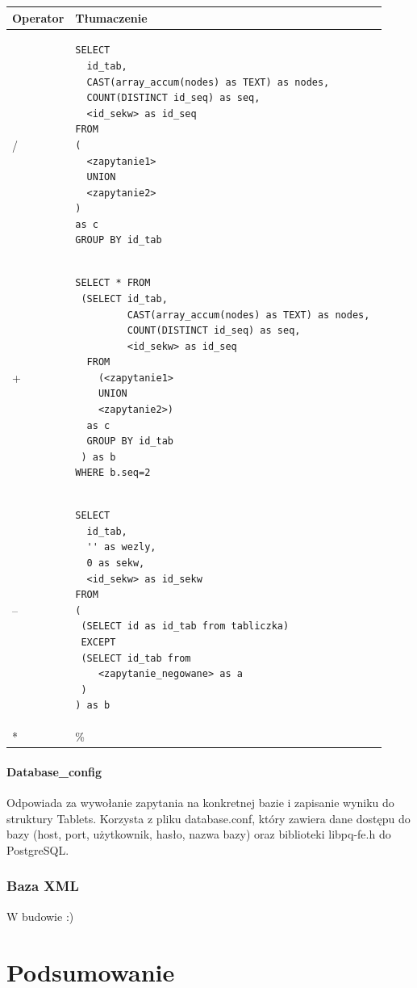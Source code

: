 \documentclass{pracamgr}
\begin{document}
\begin{longtable}{|p{1in}|p{4.5in}|}
\hline
{\bf Operator} & {\bf Tłumaczenie}\\
\hline
\endhead
/ & 
\begin{verbatim}
SELECT 
  id_tab, 
  CAST(array_accum(nodes) as TEXT) as nodes, 
  COUNT(DISTINCT id_seq) as seq,
  <id_sekw> as id_seq
FROM 
(
  <zapytanie1>
  UNION
  <zapytanie2>
)
as c
GROUP BY id_tab
\end{verbatim}
\\ 
\hline
+ &
\begin{verbatim}
SELECT * FROM
 (SELECT id_tab, 
         CAST(array_accum(nodes) as TEXT) as nodes, 
         COUNT(DISTINCT id_seq) as seq, 
         <id_sekw> as id_seq
  FROM
    (<zapytanie1>
    UNION
    <zapytanie2>)
  as c 
  GROUP BY id_tab
 ) as b
WHERE b.seq=2 
\end{verbatim}
\\ 
\hline
-- & 
\begin{verbatim}
SELECT 
  id_tab, 
  '' as wezly, 
  0 as sekw,
  <id_sekw> as id_sekw
FROM
(
 (SELECT id as id_tab from tabliczka)
 EXCEPT
 (SELECT id_tab from
    <zapytanie_negowane> as a
 )   
) as b
\end{verbatim}
\\ 
\hline
* & \%  \\ 
\hline
\end{longtable}


\subsubsection{Database\_config}

Odpowiada za wywołanie zapytania na konkretnej bazie i zapisanie wyniku do struktury Tablets.
 Korzysta z pliku database.conf, który zawiera dane dostępu do bazy (host, port, użytkownik, hasło, nazwa bazy)
oraz biblioteki libpq-fe.h do PostgreSQL.

\subsection{Baza XML}
W budowie :)

\chapter{Podsumowanie}
\end{document}

